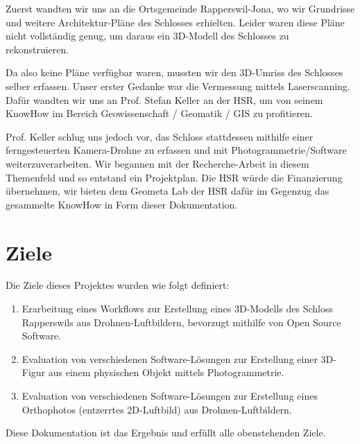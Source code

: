 Zuerst wandten wir uns an die Ortsgemeinde Rapperswil-Jona, wo wir Grundrisse
und weitere Architektur-Pläne des Schlosses erhielten. Leider waren diese Pläne
nicht vollständig genug, um daraus ein 3D-Modell des Schlosses zu rekonstruieren.

Da also keine Pläne verfügbar waren, mussten wir den 3D-Umriss des Schlosses
selber erfassen. Unser erster Gedanke war die Vermessung mittels Laserscanning.
Dafür wandten wir uns an Prof. Stefan Keller an der HSR, um von seinem KnowHow
im Bereich Geowissenschaft / Geomatik / GIS zu profitieren.

Prof. Keller schlug uns jedoch vor, das Schloss stattdessen mithilfe einer
ferngesteuerten Kamera-Drohne zu erfassen und mit Photogrammetrie\-/Software
weiterzuverarbeiten. Wir begannen mit der Recherche-Arbeit in diesem Themenfeld
und so entstand ein Projektplan. Die HSR würde die Finanzierung übernehmen, wir
bieten dem Geometa Lab der HSR dafür im Gegenzug das gesammelte KnowHow in Form
dieser Dokumentation.


\section{Ziele}\label{sec:goals}

Die Ziele dieses Projektes wurden wie folgt definiert:

\begin{enumerate}
	\item Erarbeitung eines Workflows zur Erstellung eines 3D-Modells des Schloss
		Rapperswils aus Drohnen-Luftbildern, bevorzugt mithilfe von Open Source
		Software.
	\item Evaluation von verschiedenen Software-Lösungen zur Erstellung einer
		3D-Figur aus einem physischen Objekt mittels Photogrammetrie.
	\item Evaluation von verschiedenen Software-Lösungen zur Erstellung eines
		Orthophotos (entzerrtes 2D-Luftbild) aus Drohnen-Luft\-bil\-dern.
\end{enumerate}

\noindent Diese Dokumentation ist das Ergebnis und erfüllt alle obenstehenden Ziele.
